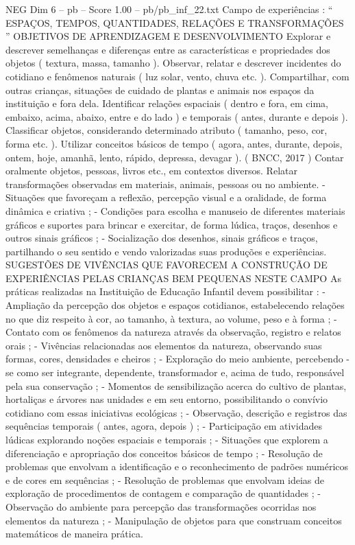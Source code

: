 \begin{textsample}{NEG Dim 6 – pb – Score 1.00 – pb/pb\_inf\_22.txt}  \label{ex:f6_neg_084}
Campo de experiências : “ ESPAÇOS, TEMPOS, QUANTIDADES, RELAÇÕES E TRANSFORMAÇÕES ” OBJETIVOS DE APRENDIZAGEM E DESENVOLVIMENTO Explorar e descrever semelhanças e diferenças entre as características e propriedades dos objetos ( textura, massa, tamanho ).
Observar, relatar e descrever incidentes do cotidiano e fenômenos naturais ( luz solar, vento, chuva etc. ).
Compartilhar, com outras crianças, situações de cuidado de plantas e animais nos espaços da instituição e fora dela.
Identificar relações espaciais ( dentro e fora, em cima, embaixo, acima, abaixo, entre e do lado ) e temporais ( antes, durante e depois ).
Classificar objetos, considerando determinado atributo ( tamanho, peso, cor, forma etc. ).
Utilizar conceitos básicos de tempo ( agora, antes, durante, depois, ontem, hoje, amanhã, lento, rápido, depressa, devagar ). ( BNCC, 2017 ) Contar oralmente objetos, pessoas, livros etc., em contextos diversos.
Relatar transformações observadas em materiais, animais, pessoas ou no ambiente. - Situações que favoreçam a reflexão, percepção visual e a oralidade, de forma dinâmica e criativa ; - Condições para escolha e manuseio de diferentes materiais gráficos e suportes para brincar e exercitar, de forma lúdica, traços, desenhos e outros sinais gráficos ; - Socialização dos desenhos, sinais gráficos e traços, partilhando o seu sentido e vendo valorizadas suas produções e experiências.
SUGESTÕES DE VIVÊNCIAS QUE FAVORECEM A CONSTRUÇÃO DE EXPERIÊNCIAS PELAS CRIANÇAS BEM PEQUENAS NESTE CAMPO As práticas realizadas na Instituição de Educação Infantil devem possibilitar : - Ampliação da percepção dos objetos e espaços cotidianos, estabelecendo relações no que diz respeito à cor, ao tamanho, à textura, ao volume, peso e à forma ; - Contato com os fenômenos da natureza através da observação, registro e relatos orais ; - Vivências relacionadas aos elementos da natureza, observando suas formas, cores, densidades e cheiros ; - Exploração do meio ambiente, percebendo -se como ser integrante, dependente, transformador e, acima de tudo, responsável pela sua conservação ; - Momentos de sensibilização acerca do cultivo de plantas, hortaliças e árvores nas unidades e em seu entorno, possibilitando o convívio cotidiano com essas iniciativas ecológicas ; - Observação, descrição e registros das sequências temporais ( antes, agora, depois ) ; - Participação em atividades lúdicas explorando noções espaciais e temporais ; - Situações que explorem a diferenciação e apropriação dos conceitos básicos de tempo ; - Resolução de problemas que envolvam a identificação e o reconhecimento de padrões numéricos e de cores em sequências ; - Resolução de problemas que envolvam ideias de exploração de procedimentos de contagem e comparação de quantidades ; - Observação do ambiente para percepção das transformações ocorridas nos elementos da natureza ; - Manipulação de objetos para que construam conceitos matemáticos de maneira prática.

\end{textsample}
